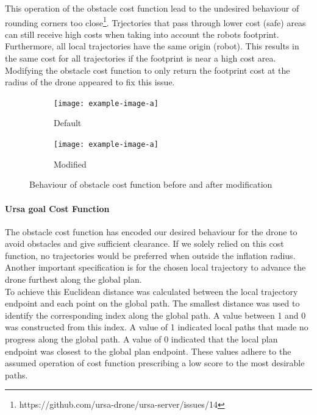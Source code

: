 \documentclass[capstone_report.tex]{subfiles}
\begin{document}
This operation of the obstacle cost function lead to the undesired behaviour of rounding corners too close\footnote{https://github.com/ursa-drone/ursa-server/issues/14}.  Trjectories that pass through lower cost (safe) areas can still receive high costs when taking into account the robots footprint.  Furthermore, all local trajectories have the same origin (robot).  This results in the same cost for all trajectories if the footprint is near a high cost area.  Modifying the obstacle cost function to only return the footprint cost at the radius of the drone appeared to fix this issue.

\begin{figure}[H]
    \centering
    \begin{subfigure}{0.5\textwidth}
        \centering
        \texttt{[image: example-image-a]}
        \caption{Default}
        \label{fig:ocf_default}
    \end{subfigure}%
    \begin{subfigure}{0.5\textwidth}
        \centering
        \texttt{[image: example-image-a]}
        \caption{Modified}
        \label{fig:ocf_mod}
    \end{subfigure}
    \caption{Behaviour of obstacle cost function before and after modification}\label{fig:ocf_comp}
\end{figure}

\paragraph{Ursa goal Cost Function}
The obstacle cost function has encoded our desired behaviour for the drone to avoid obstacles and give sufficient clearance.  If we solely relied on this cost function, no trajectories would be preferred when outside the inflation radius.
Another important specification is for the chosen local trajectory to advance the drone furthest along the global plan.\\

To achieve this Euclidean distance was calculated between the local trajectory endpoint and each point on the global path.  The smallest distance was used to identify the corresponding index along the global path.  A value between 1 and 0 was constructed from this index.  A value of 1 indicated local paths that made no progress along the global path.  A value of 0 indicated that the local plan endpoint was closest to the global plan endpoint.  These values adhere to the assumed operation of cost function prescribing a low score to the most desirable paths.
\end{document}
